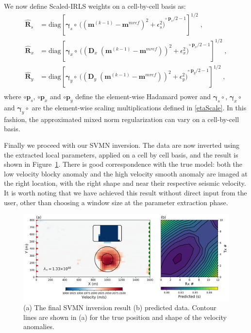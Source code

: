 \documentclass[extra,referee]{gji}
\begin{document}
We now define Scaled-IRLS weights on a cell-by-cell basis as:
\begin{equation}\label{mixedIRLS}
\begin{split}
\mathbf{\hat R}_s &= \text{diag} \left[\boldsymbol{\gamma}_s \circ \:{\Big( ({{\mathbf{m}^{(k-1)} - \mathbf{m}^{mref}}})^{2} + \epsilon_s^2 \Big)}^{\circ\:\mathbf{p}_s/2 - 1} \right]^{1/2} \;, \\
\mathbf{\hat R}_x &= \text{diag} \left[\boldsymbol{\gamma}_x \circ\:{\Big( ({{\mathbf{D}_x\;(\mathbf{m}^{(k-1)} - \mathbf{m}^{mref})}})^{2} + \epsilon_x^2 \Big)}^{\circ\:\mathbf{p}_x/2 - 1} \right]^{1/2} \;,\\
\mathbf{\hat R}_y &= \text{diag} \left[\boldsymbol{\gamma}_y \circ\:{\Big( ({{\mathbf{D}_y\;(\mathbf{m}^{(k-1)} - \mathbf{m}^{mref})}})^{2} + \epsilon_y^2 \Big)}^{\circ\:\mathbf{p}_y/2 - 1} \right]^{1/2} \;,\\
\end{split}
\end{equation}
where $\circ\mathbf{p}_s$, $\circ\mathbf{p}_{x}$ and $\circ\mathbf{p}_y$ define the element-wise Hadamard power and $\boldsymbol{\gamma}_s \circ$, $\boldsymbol{\gamma}_x \circ$ and $\boldsymbol{\gamma}_y\circ$ are the element-wise scaling multiplications defined in \eqref{etaScale}. In this fashion, the approximated mixed norm regularization can vary on a cell-by-cell basis.

Finally we proceed with our SVMN inversion. The data are now inverted using the extracted local parameters, applied on a cell by cell basis, and the result is shown in Figure~\ref{FinalMixedNorm}. There is good correspondence with the true model: both the low velocity blocky anomaly and the high velocity smooth anomaly are imaged at the right location, with the right shape and near their respective seismic velocity. It is worth noting that we have achieved this result without direct input from the user, other than choosing a window size at the parameter extraction phase.
\begin{figure}
\includegraphics[width=\columnwidth]{Figures/Tomo2D_Reinverted_Variance.png}
\caption{(a) The final SVMN inversion result (b) predicted data. Contour lines are shown in (a) for the true position and shape of the velocity anomalies.}
\label{FinalMixedNorm}
\end{figure}
\end{document}
